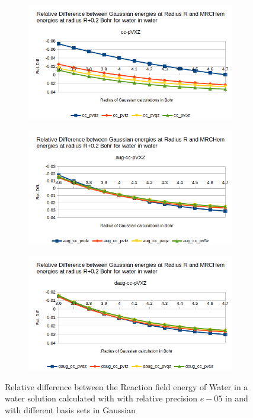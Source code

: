 \documentclass[../master_thesis.tex]{subfiles}
\begin{document}
\begin{figure}[h!]
  \centering
  \begin{subfigure}[b]{0.75\linewidth}
    \includegraphics[width=\linewidth]{img/watreldiff02.png}
  \end{subfigure}
  \begin{subfigure}[b]{0.75\linewidth}
    \includegraphics[width=\linewidth]{img/wataugreldiff02.png}
  \end{subfigure}
  \begin{subfigure}[b]{0.75\linewidth}
    \includegraphics[width=\linewidth]{img/watdaugreldiff02.png}
  \end{subfigure}
  \caption{Relative difference between the Reaction field energy of Water in a water solution calculated with with relative precision $e-05$ in \mrchem
  and with different basis sets in Gaussian}
  \label{fig:watreldiff02}
\end{figure}
\end{document}
